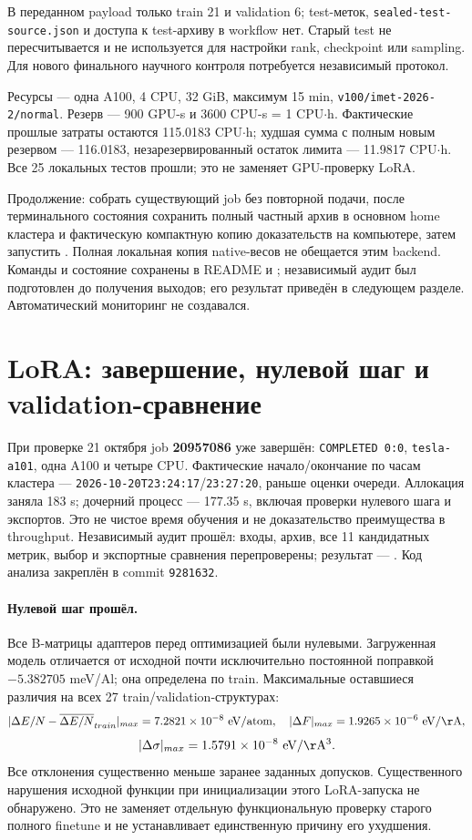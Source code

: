 \documentclass[11pt,a4paper]{article}
\begin{document}
В переданном payload только train 21 и validation 6; test-меток,
\texttt{sealed-test-source.json} и доступа к test-архиву в workflow нет.
Старый test не пересчитывается и не используется для настройки rank,
checkpoint или sampling. Для нового финального научного контроля
потребуется независимый протокол.

Ресурсы --- одна A100, 4 CPU, 32 GiB, максимум 15 min,
\texttt{v100/imet-2026-2/normal}. Резерв --- 900 GPU-s и
3600 CPU-s = 1 CPU$\cdot$h. Фактические прошлые затраты остаются
115.0183 CPU$\cdot$h; худшая сумма с полным новым резервом ---
116.0183, незарезервированный остаток лимита --- 11.9817 CPU$\cdot$h.
Все 25 локальных тестов прошли; это не заменяет GPU-проверку LoRA.

Продолжение: собрать существующий job без повторной подачи,
после терминального состояния сохранить полный частный архив в
основном home кластера и фактическую компактную копию доказательств
на компьютере, затем запустить .
Полная локальная копия native-весов не обещается этим backend.
Команды и состояние сохранены в README и ;
независимый аудит был подготовлен до получения выходов; его результат
приведён в следующем разделе.
Автоматический мониторинг не создавался.

\section{LoRA: завершение, нулевой шаг и validation-сравнение}
\label{sec:lora-result}
При проверке 21 октября job \textbf{20957086} уже завершён:
\texttt{COMPLETED 0:0}, \texttt{tesla-a101}, одна A100 и четыре CPU.
Фактические начало/окончание по часам кластера ---
\texttt{2026-10-20T23:24:17}/\texttt{23:27:20}, раньше оценки очереди.
Аллокация заняла 183 s; дочерний процесс --- 177.35 s, включая
проверки нулевого шага и экспортов. Это не чистое время обучения
и не доказательство преимущества в throughput.
Независимый аудит  прошёл:
входы, архив, все 11 кандидатных метрик, выбор и экспортные сравнения
перепроверены; результат ---
.
Код анализа закреплён в commit \texttt{9281632}.

\paragraph{Нулевой шаг прошёл.}
Все B-матрицы адаптеров перед оптимизацией были нулевыми.
Загруженная модель отличается от исходной почти исключительно
постоянной поправкой $-5.382705$ meV/Al; она определена по train.
Максимальные оставшиеся различия на всех 27 train/validation-структурах:
\[
 |\Delta E/N-\overline{\Delta E/N}_{train}|_{max}
 =7.2821\times10^{-8}\ \mathrm{eV/atom},\quad
 |\Delta F|_{max}=1.9265\times10^{-6}\ \mathrm{eV/\AA},
\]
\[
 |\Delta\sigma|_{max}=1.5791\times10^{-8}\ \mathrm{eV/\AA^3}.
\]
Все отклонения существенно меньше заранее заданных допусков.
Существенного нарушения исходной функции при инициализации этого
LoRA-запуска не обнаружено. Это не заменяет отдельную функциональную
проверку старого полного finetune и не устанавливает единственную
причину его ухудшения.
\end{document}
